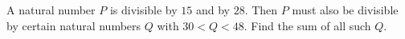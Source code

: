 A natural number $P$ is divisible by $15$ and by $28$. Then $P$ must also be divisible by certain natural numbers $Q$ with $30<Q<48$. Find the sum of all such $Q$.
